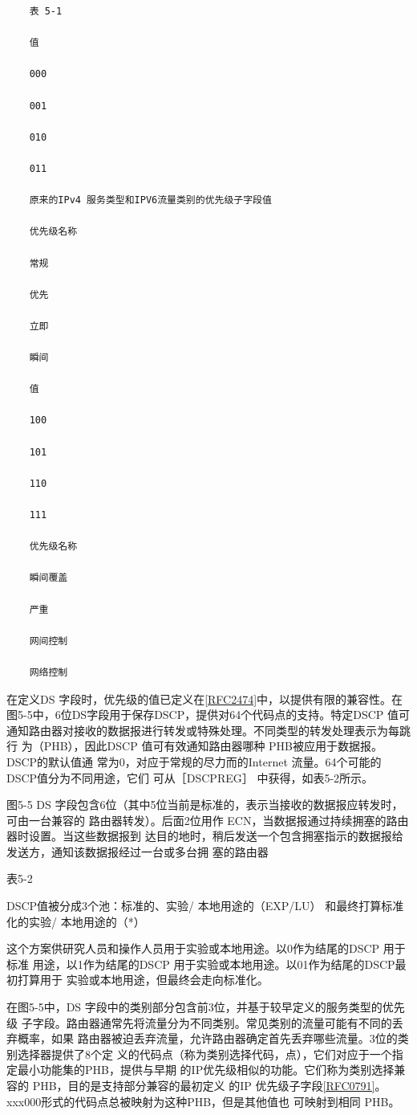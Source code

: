 \begin{verbatim}
    表 5-1
    
    值
    
    000
    
    001
    
    010
    
    011
    
    原来的IPv4 服务类型和IPV6流量类别的优先级子字段值
    
    优先级名称
    
    常规
    
    优先
    
    立即
    
    瞬间
    
    值
    
    100
    
    101
    
    110
    
    111
    
    优先级名称
    
    瞬间覆盖
    
    严重
    
    网间控制
    
    网络控制
\end{verbatim}

在定义DS 字段时，优先级的值已定义在\href{https://www.rfc-editor.org/rfc/rfc2474}{[RFC2474]}中，以提供有限的兼容性。在
图5-5中，6位DS字段用于保存DSCP，提供对64个代码点的支持。特定DSCP 值可
通知路由器对接收的数据报进行转发或特殊处理。不同类型的转发处理表示为每跳行
为（PHB），因此DSCP 值可有效通知路由器哪种 PHB被应用于数据报。DSCP的默认值通
常为0，对应于常规的尽力而的Internet 流量。64个可能的DSCP值分为不同用途，它们
可从［DSCPREG］ 中获得，如表5-2所示。

图5-5 DS 字段包含6位（其中5位当前是标准的，表示当接收的数据报应转发时，可由一台兼容的
路由器转发）。后面2位用作 ECN，当数据报通过持续拥塞的路由器时设置。当这些数据报到
达目的地时，稍后发送一个包含拥塞指示的数据报给发送方，通知该数据报经过一台或多台拥
塞的路由器

表5-2

DSCP值被分成3个池：标准的、实验/ 本地用途的（EXP/LU）
和最终打算标准化的实验/ 本地用途的（*）

这个方案供研究人员和操作人员用于实验或本地用途。以0作为结尾的DSCP 用于标准
用途，以1作为结尾的DSCP 用于实验或本地用途。以01作为结尾的DSCP最初打算用于
实验或本地用途，但最终会走向标准化。

在图5-5中，DS 字段中的类别部分包含前3位，并基于较早定义的服务类型的优先级
子字段。路由器通常先将流量分为不同类别。常见类别的流量可能有不同的丢弃概率，如果
路由器被迫丢弃流量，允许路由器确定首先丢弃哪些流量。3位的类别选择器提供了8个定
义的代码点（称为类别选择代码，点），它们对应于一个指定最小功能集的PHB，提供与早期
的IP优先级相似的功能。它们称为类别选择兼容的 PHB，目的是支持部分兼容的最初定义
的IP 优先级子字段\href{https://www.rfc-editor.org/rfc/rfc0791}{[RFC0791]}。xxx000形式的代码点总被映射为这种PHB，但是其他值也
可映射到相同 PHB。

